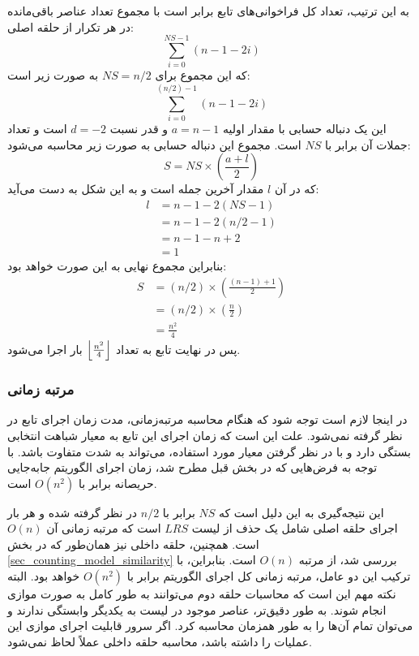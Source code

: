 به این ترتیب، تعداد کل فراخوانی‌های تابع
برابر است با مجموع تعداد عناصر باقی‌مانده در هر تکرار از حلقه اصلی:
\begin{equation}
	\sum_{i=0}^{NS-1} (n-1-2i)
\end{equation}
که این مجموع برای \( NS=n/2 \) به صورت زیر است:
\begin{equation}
	\sum_{i=0}^{(n/2)-1} (n-1-2i)
\end{equation}
این یک دنباله حسابی با مقدار اولیه \(a=n-1\) و قدر نسبت
 \(d=-2\) 
است و تعداد جملات آن برابر با \( NS \) است.
مجموع این دنباله حسابی به صورت زیر محاسبه می‌شود:
\begin{equation}
	S = NS \times \left( \frac{a+l}{2} \right)
\end{equation}
که در آن \( l \) مقدار آخرین جمله است و به این شکل به دست می‌آید:
\begin{equation}
	\begin{align*} 
		l &= n-1-2(NS-1) \\
		  &= n-1-2(n/2-1) \\
		  &= n-1-n+2 \\
		  &= 1
	\end{align*}
\end{equation}
بنابراین مجموع نهایی به این صورت خواهد بود:
\begin{equation}
	\begin{align*} 
		S &= (n/2) \times \left( \frac{(n-1)+1}{2} \right) \\
		&= (n/2) \times \left( \frac{n}{2} \right) \\
		&= \frac{n^2}{4}
	\end{align*}
\end{equation}
پس در نهایت تابع
به تعداد
\(
\left \lfloor \frac{n^2}{4} \right \rfloor
 \) 
بار اجرا می‌شود.

\vspace{3mm}
\subsubsection{مرتبه زمانی}\vspace{-1mm}
در اینجا لازم است توجه شود که هنگام محاسبه مرتبه‌زمانی، مدت زمان اجرای تابع
در نظر گرفته نمی‌شود. علت این است که زمان اجرای این تابع به معیار شباهت انتخابی بستگی دارد و با در نظر گرفتن معیار مورد استفاده، می‌تواند به شدت متفاوت باشد. با توجه به فرض‌هایی که در بخش قبل مطرح شد، زمان اجرای الگوریتم جابه‌جایی حریصانه برابر با \( O(n^2) \) است.

این نتیجه‌گیری به این دلیل است که \( NS \) برابر با \( n/2 \) در نظر گرفته شده و هر بار اجرای حلقه اصلی شامل یک حذف از لیست \( LRS \) است که مرتبه زمانی آن \( O(n) \) است. همچنین، حلقه داخلی نیز همان‌طور که در بخش
\ref{sec_counting_model_similarity}
بررسی شد، از مرتبه \( O(n) \) است. بنابراین، با ترکیب این دو عامل، مرتبه زمانی کل اجرای الگوریتم برابر با \( O(n^2) \) خواهد بود. البته نکته مهم این است که محاسبات حلقه دوم می‌توانند به طور کامل به صورت موازی انجام شوند. به طور دقیق‌تر، عناصر موجود در لیست 
به یکدیگر وابستگی ندارند و می‌توان تمام آن‌ها را به طور همزمان محاسبه کرد. اگر سرور قابلیت اجرای موازی این عملیات را داشته باشد، محاسبه حلقه داخلی عملاً لحاظ نمی‌شود.

